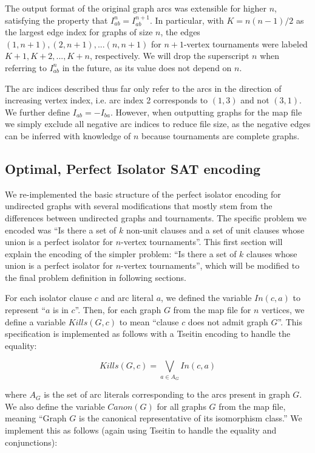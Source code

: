 \documentclass[a4paper,UKenglish,cleveref, autoref, thm-restate]{lipics-v2021}
\begin{document}
The output format of the original graph arcs was extensible for higher $n$, satisfying the property that $I_{ab}^n = I_{ab}^{n+1}$. In particular, with $K = n(n-1)/2$ as the largest edge index for graphs of size $n$, the edges $(1,n+1), (2,n+1), ... (n, n+1)$ for $n+1$-vertex tournaments were labeled $K+1, K+2,...,K+n$, respectively. We will drop the superscript $n$ when referring to $I_{ab}^n$ in the future, as its value does not depend on $n$.

The arc indices described thus far only refer to the arcs in the direction of increasing vertex index, i.e. arc index 2 corresponds to $(1,3)$ and not $(3,1)$. We further define $I_{ab} = -I_{ba}$. However, when outputting graphs for the map file we simply exclude all negative arc indices to reduce file size, as the negative edges can be inferred with knowledge of $n$ because tournaments are complete graphs.

\subsection{Optimal, Perfect Isolator SAT encoding}

We re-implemented the basic structure of the perfect isolator encoding for undirected graphs \cite{ref_heule} with several modifications that mostly stem from the differences between undirected graphs and tournaments. The specific problem we encoded was ``Is there a set of $k$ non-unit clauses and a set of unit clauses whose union is a perfect isolator for $n$-vertex tournaments''. This first section will explain the encoding of the simpler problem: ``Is there a set of $k$ clauses whose union is a perfect isolator for $n$-vertex tournaments'', which will be modified to the final problem definition in following sections.

For each isolator clause $c$ and arc literal $a$, we defined the variable $In(c, a)$ to represent ``$a$ is in $c$''. Then, for each graph $G$ from the map file for $n$ vertices, we define a variable $Kills(G,c)$ to mean ``clause $c$ does not admit graph $G$''. This specification is implemented as follows with a Tseitin encoding \cite{ref_tseitin} to handle the equality:

\begin{equation}
Kills(G,c) = \bigvee\limits_{a \in A_G}In(c, a)
\end{equation}

where $A_G$ is the set of arc literals corresponding to the arcs present in graph $G$. We also define the variable $Canon(G)$ for all graphs $G$ from the map file, meaning ``Graph $G$ is the canonical representative of its isomorphism class.'' We implement this as follows (again using Tseitin to handle the equality and conjunctions):
\end{document}
